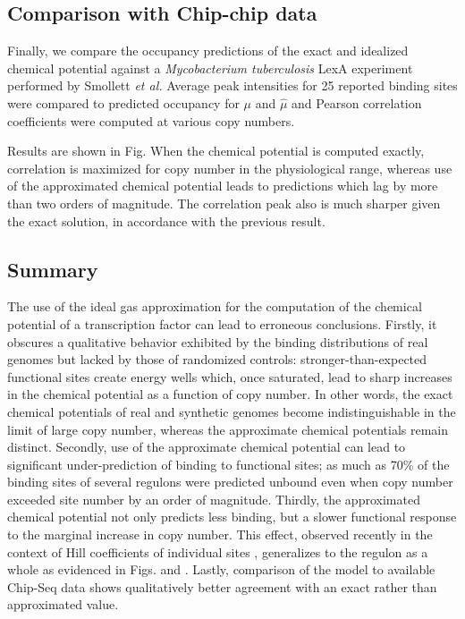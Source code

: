 \documentclass{article}
\begin{document}
\subsection{Comparison with Chip-chip data}
Finally, we compare the occupancy predictions of the exact and
idealized chemical potential against a \textit{Mycobacterium
  tuberculosis} LexA experiment performed by Smollett \textit{et al.}
\cite{smollett12} Average peak intensities for 25 reported binding
sites were compared to predicted occupancy for $\mu$ and $\hat\mu$ and
Pearson correlation coefficients were computed at various copy
numbers.

Results are shown in Fig. %
When the
chemical potential is computed exactly, correlation is maximized for
copy number in the physiological range, whereas use of the
approximated chemical potential leads to predictions which lag by more
than two orders of magnitude.  The correlation peak also is much
sharper given the exact solution, in accordance with the previous
result.



\subsection{Summary}
The use of the ideal gas approximation for the computation of the
chemical potential of a transcription factor can lead to erroneous
conclusions.  Firstly, it obscures a qualitative behavior exhibited by
the binding distributions of real genomes but lacked by those of
randomized controls: stronger-than-expected functional sites create
energy wells which, once saturated, lead to sharp increases in the
chemical potential as a function of copy number.  In other words, the
exact chemical potentials of real and synthetic genomes become
indistinguishable in the limit of large copy number, whereas the
approximate chemical potentials remain distinct.  Secondly, use of the
approximate chemical potential can lead to significant
under-prediction of binding to functional sites; as much as 70\% of
the binding sites of several regulons were predicted unbound even when
copy number exceeded site number by an order of magnitude.  Thirdly,
the approximated chemical potential not only predicts less binding,
but a slower functional response to the marginal increase in copy
number.  This effect, observed recently in the context of Hill
coefficients of individual sites \cite{sheinman12}, generalizes to the
regulon as a whole as evidenced in
Figs. \label{fig:occupancy_vs_copy_number}
and \label{fig:occupancy_vs_copy_number_examples}.  Lastly, comparison
of the model to available Chip-Seq data shows qualitatively better
agreement with an exact rather than approximated value.



 \newpage
{}
 \newpage
\end{document}
